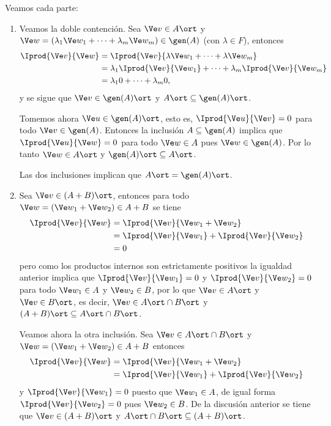 	\begin{sol}
		Veamos cada parte:
		
		\begin{enumerate}
			\item Veamos la doble contención. Sea $\Ve v\in A\ort$ y $\Ve w = (\lambda_1 \Ve w_1+\cdots+\lambda_m \Ve w_m)\in\gen(A)$ (con $\lambda\in F$), entonces
			\begin{align*}
			\Iprod{\Ve v}{\Ve w} &= \Iprod{\Ve v}{\lambda \Ve w_1+\cdots+\lambda \Ve w_m} \\
			&= \lambda_1\Iprod{\Ve v}{\Ve w_1} + \cdots +\lambda_m\Iprod{\Ve v}{\Ve w_m} \\
			&= \lambda_1 0 + \cdots + \lambda_m 0,
			\end{align*}
			y se sigue que $\Ve v\in\gen(A)\ort$ y $A\ort\subseteq\gen(A)\ort$.
			
			Tomemos ahora $\Ve u\in\gen(A)\ort$, esto es, $\Iprod{\Ve u}{\Ve v} = 0$ para todo $\Ve v\in\gen(A)$. Entonces la inclusión $A\subseteq\gen(A)$ implica que $\Iprod{\Ve u}{\Ve w} = 0$ para todo $\Ve w\in A$ pues $\Ve w\in\gen(A)$. Por lo tanto $\Ve w\in A\ort$ y $\gen(A)\ort\subseteq A\ort$.
			
			Las dos inclusiones implican que $A\ort=\gen(A)\ort$. 
			
			\item  Sea $\Ve v\in(A+B)\ort$, entonces para todo $\Ve w=(\Ve w_1+\Ve w_2)\in A+B$ se tiene
			\begin{align*}
			\Iprod{\Ve v}{\Ve w} &= \Iprod{\Ve v}{\Ve w_1+\Ve w_2} \\
			&= \Iprod{\Ve v}{\Ve w_1} + \Iprod{\Ve v}{\Ve w_2} \\
			&=0
			\end{align*}
			pero como los productos internos son estrictamente positivos la igualdad anterior implica que $\Iprod{\Ve v}{\Ve w_1} = 0$ y $\Iprod{\Ve v}{\Ve w_2} = 0$ para todo $\Ve w_1\in A$ y $\Ve w_2\in B$, por lo que $\Ve v\in A\ort$ y $\Ve v\in B\ort$, es decir, $\Ve v\in A\ort\cap B\ort$ y $(A+ B)\ort\subseteq A\ort\cap B\ort$.
			
			Veamos ahora la otra inclusión. Sea $\Ve v\in A\ort\cap B\ort$ y $\Ve w=(\Ve w_1+\Ve w_2)\in A+B$ entonces
			\begin{align*}
			\Iprod{\Ve v}{\Ve w} &= \Iprod{\Ve v}{\Ve w_1+\Ve w_2} \\
			&= \Iprod{\Ve v}{\Ve w_1} + \Iprod{\Ve v}{\Ve w_2} \\
			\end{align*}
			y $\Iprod{\Ve v}{\Ve w_1} = 0$ puesto que $\Ve w_1\in A$, de igual forma $\Iprod{\Ve v}{\Ve w_2} = 0$ pues $\Ve w_2\in B$. De la discusión anterior se tiene que $\Ve v\in(A+B)\ort$ y $A\ort\cap B\ort\subseteq (A+ B)\ort$.
			

\end{enumerate}
\end{sol}

